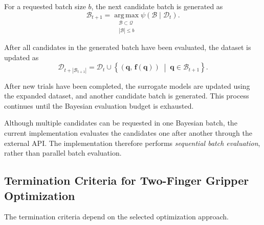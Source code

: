 For a requested batch size $b$, the next candidate batch is generated as
\begin{equation}
    \mathcal{B}_{t+1}
    =
    \operatorname*{arg\,max}_{
        \substack{
            \mathcal{B}\subset\mathcal{Q}\\
            |\mathcal{B}|\leq b
        }
    }
    \psi(\mathcal{B}\mid\mathcal{D}_t).
\end{equation}

After all candidates in the generated batch have been evaluated, the dataset is updated as
\begin{equation}
    \mathcal{D}_{t+|\mathcal{B}_{t+1}|}
    =
    \mathcal{D}_t
    \cup
    \left\{
        \left(
            \mathbf{q},\,
            \mathbf{f}(\mathbf{q})
        \right)
        \;\middle|\;
        \mathbf{q}\in\mathcal{B}_{t+1}
    \right\}.
\end{equation}

After new trials have been completed, the surrogate models are updated using the expanded dataset,
and another candidate batch is generated. This process continues until the Bayesian evaluation
budget is exhausted.

Although multiple candidates can be requested in one Bayesian batch, the current implementation
evaluates the candidates one after another through the external API. The implementation therefore
performs \emph{sequential batch evaluation}, rather than parallel batch evaluation.

\subsection{Termination Criteria for Two-Finger Gripper Optimization}
\label{sec:two_finger_termination}

The termination criteria depend on the selected optimization approach.

